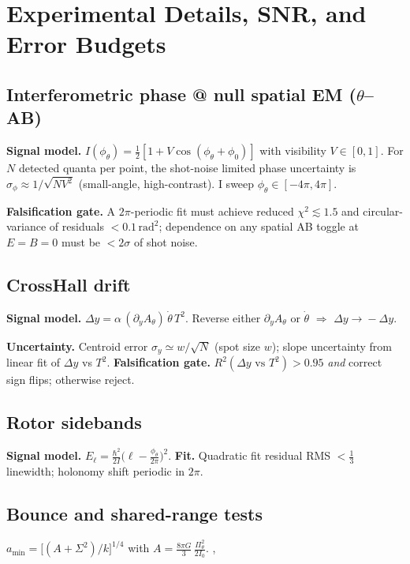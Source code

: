 \section*{Experimental Details, SNR, and Error Budgets}

\subsection*{Interferometric phase @ null spatial EM (\texorpdfstring{$\theta$--AB}{theta--AB})}
\textbf{Signal model.} $I(\phi_\theta)=\tfrac{1}{2}\!\left[1+V\cos(\phi_\theta+\phi_0)\right]$ with visibility $V\in[0,1]$.
For $N$ detected quanta per point, the shot-noise limited phase uncertainty is
$\sigma_\phi \approx 1/\sqrt{N V^2}$ (small-angle, high-contrast). I sweep $\phi_\theta\in[-4\pi,4\pi]$.

\textbf{Falsification gate.} A $2\pi$-periodic fit must achieve reduced $\chi^2\!\lesssim\!1.5$ and circular-variance of residuals $<0.1\,\mathrm{rad}^2$; dependence on any spatial AB toggle at $E{=}B{=}0$ must be $<2\sigma$ of shot noise.

\subsection*{Cross\textendash Hall drift}
\textbf{Signal model.} $\Delta y = \alpha\,(\partial_y A_\theta)\,\dot\theta\,T^2$. Reverse either $\partial_y A_\theta$ or $\dot\theta$ $\Rightarrow$ $\Delta y\!\to\! -\Delta y$.

\textbf{Uncertainty.} Centroid error $\sigma_y \simeq w/\sqrt{N}$ (spot size $w$); slope uncertainty from linear fit of $\Delta y$ vs $T^2$.  
\textbf{Falsification gate.} $R^2(\Delta y\text{ vs }T^2)\!>\!0.95$ \emph{and} correct sign flips; otherwise reject.

\subsection*{Rotor sidebands}
\textbf{Signal model.} $E_\ell=\frac{\hbar^2}{2I}\big(\ell-\frac{\phi_\theta}{2\pi}\big)^2$.  
\textbf{Fit.} Quadratic fit residual RMS $<\tfrac{1}{3}$ linewidth; holonomy shift periodic in $2\pi$.  

\subsection*{Bounce and shared-range tests}
$a_{\min}=\big[(A+\Sigma^2)/k\big]^{1/4}$ with $A=\tfrac{8\pi G}{3}\,\tfrac{\Pi_\theta^2}{2I_0}$.  
, 
